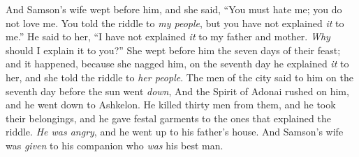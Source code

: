 \begin{biblechapter}
\verse And Samson’s wife wept before him, and she said, “You must hate me; you do not love me. You told the riddle to \textit{my people}, but you have not explained \textit{it} to me.” He said to her, “I have not explained \textit{it} to my father and mother. \textit{Why} should I explain it to you?”
\verse She wept before him the seven days of their feast; and it happened, because she nagged him, on the seventh day he explained \textit{it} to her, and she told the riddle to \textit{her people}.
\verse The men of the city said to him on the seventh day before the sun went \textit{down},
\verse And the Spirit of Adonai rushed on him, and he went down to Ashkelon. He killed thirty men from them, and he took their belongings, and he gave festal garments to the ones that explained the riddle. \textit{He was angry}, and he went up to his father’s house.
\verse And Samson’s wife was \textit{given} to his companion who \textit{was} his best man.
\end{biblechapter}

